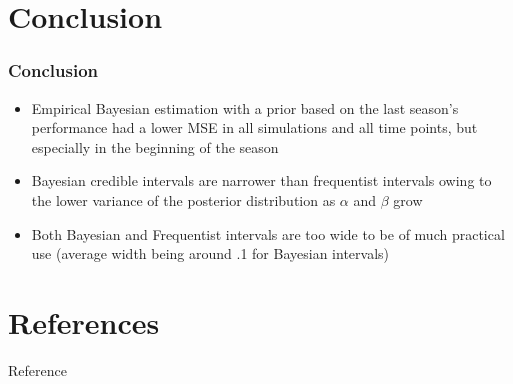\documentclass{beamer}
\begin{document}
\section{Conclusion}
\begin{frame}
	\frametitle{Conclusion}
	\begin{itemize}
		\item Empirical Bayesian estimation with a prior based on the last season's performance had a lower MSE in all simulations and all time points, but especially in the beginning of the season
		\item Bayesian credible intervals are narrower than frequentist intervals owing to the lower variance of the posterior distribution as $\alpha$ and $\beta$ grow
		\item Both Bayesian and Frequentist intervals are too wide to be of much practical use (average width being around .1 for Bayesian intervals)
	\end{itemize}
\end{frame}

\section{References}
\begin{frame}{Reference}
\printbibliography
\end{frame}
\end{document}
